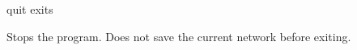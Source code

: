 \begin{nusmvCommand} {quit} {exits \nusmvhead}
 

Stops the program.  Does not save the current network before
exiting.\\
\begin{cmdOpt}
\end{cmdOpt}
\end{nusmvCommand}
